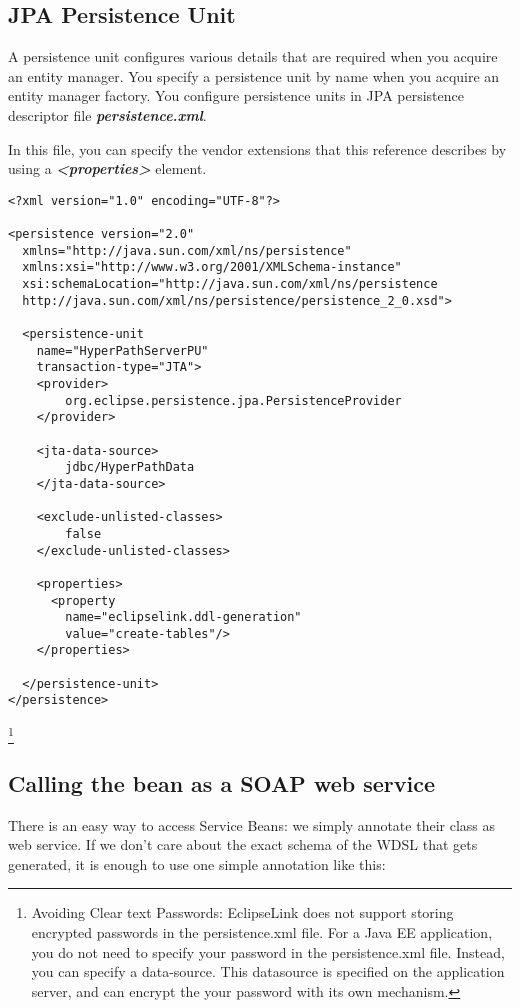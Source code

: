 \subsection{JPA Persistence Unit}
A persistence unit configures various details that are required when you acquire an entity manager. You specify a persistence unit by name when you acquire an entity manager factory. You configure persistence units in JPA persistence descriptor file \textbf{\textit{\textsf{persistence.xml}}}. 

In this file, you can specify the vendor extensions that this reference describes by using a \textit{\textbf{\textsf{<properties>}}} element.

\begin{lstlisting}[label=Persistence unit persistence.xml,caption=Persistence unit persistence.xml]
<?xml version="1.0" encoding="UTF-8"?>

<persistence version="2.0" 
  xmlns="http://java.sun.com/xml/ns/persistence" 
  xmlns:xsi="http://www.w3.org/2001/XMLSchema-instance"
  xsi:schemaLocation="http://java.sun.com/xml/ns/persistence
  http://java.sun.com/xml/ns/persistence/persistence_2_0.xsd">
  
  <persistence-unit 
  	name="HyperPathServerPU" 
  	transaction-type="JTA">
    <provider>
    	org.eclipse.persistence.jpa.PersistenceProvider
    </provider>

    <jta-data-source>
    	jdbc/HyperPathData
    </jta-data-source>

    <exclude-unlisted-classes>
    	false
    </exclude-unlisted-classes>

    <properties>
      <property 
      	name="eclipselink.ddl-generation" 
      	value="create-tables"/>
    </properties>

  </persistence-unit>
</persistence>
\end{lstlisting}

\footnote{Avoiding Clear text Passwords: EclipseLink does not support storing encrypted passwords in the persistence.xml file. For a Java EE application, you do not need to specify your password in the persistence.xml file. Instead, you can specify a data-source. This datasource is specified on the application server, and can encrypt the your password with its own mechanism.
} 

\subsection{Calling the bean as a SOAP web service}
There is an easy way to access Service Beans: we simply annotate their class as web service. If we don’t care about the exact schema of the WDSL that gets generated, it is enough to use one simple annotation like this:

